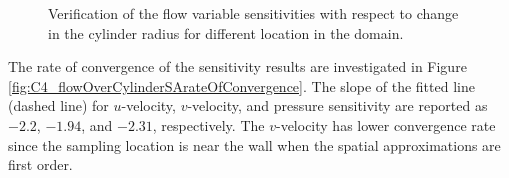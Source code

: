 \begin{figure}[H]
{    }
    \quad
    \caption{Verification of the flow variable sensitivities with respect to change in the cylinder radius for different location in the domain.}
    \label{fig:C4_flowOverCylinderSensitivityValidation}
\end{figure}

The rate of convergence of the sensitivity results are investigated in Figure \ref{fig:C4_flowOverCylinderSArateOfConvergence}. The slope of the fitted line (dashed line) for $u$-velocity, $v$-velocity, and pressure sensitivity are reported as $-2.2$, $-1.94$, and $-2.31$, respectively. The $v$-velocity has lower convergence rate since the sampling location is near the wall when the spatial approximations are first order.

